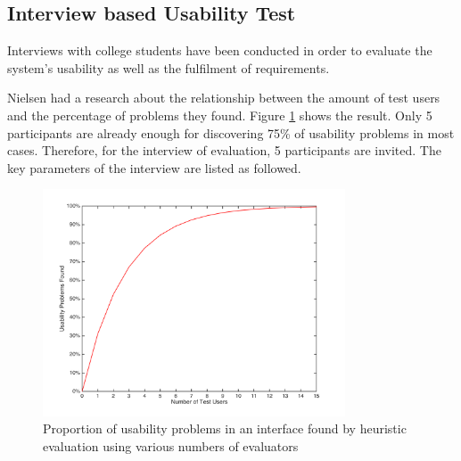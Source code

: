 


\subsection{Interview based Usability Test}

Interviews with college students have been conducted in order to evaluate the system's usability as well as the fulfilment of requirements. 

Nielsen had a research about the relationship between the amount of test users and the percentage of problems they found. Figure \ref{fig:eval-nielsen} shows the result\cite{nielsen2001conduct}. Only 5 participants are already enough for discovering 75\% of usability problems in most cases. Therefore, for the interview of evaluation, 5 participants are invited. The key parameters of the interview are listed as followed. 

\begin{figure}[!htbp]
  \centering
    \includegraphics[width=0.8\textwidth]{Figures/eval-nielsen.png}
  \caption{Proportion of usability problems in an interface found by heuristic evaluation using various numbers of evaluators}
  \label{fig:eval-nielsen}
\end{figure}

